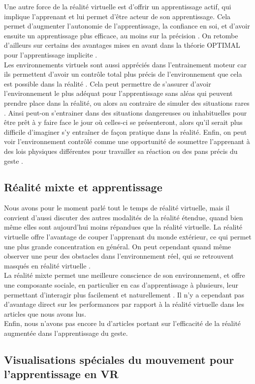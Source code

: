 Une autre force de la réalité virtuelle est d'offrir un apprentissage actif, qui implique l'apprenant et lui permet d'être acteur de son apprentissage. 
Cela permet d'augmenter l'autonomie de l'apprentissage, la confiance en soi, et d'avoir ensuite un apprentissage plus efficace, au moins sur la précision \cite{ApplicationVRForTraining.Tang}. 
On retombe d'ailleurs sur certains des avantages mises en avant dans la théorie OPTIMAL pour l'apprentissage implicite \cite{OPTIMAL.Wulf+}. \\

Les environnements virtuels sont aussi appréciés dans l'entrainement moteur car ils permettent d'avoir un contrôle total plus précis de l'environnement que cela est possible dans la réalité \cite{ComplexSkillVRLearningReview.Levac+}.
Cela peut permettre de s'assurer d'avoir l'environnement le plus adéquat pour l'apprentissage sans aléas qui peuvent prendre place dans la réalité, ou alors au contraire de simuler des situations rares \cite{InvestigateAcquireSkill.Mangalam+}.
Ainsi peut-on s'entrainer dans des situations dangereuses ou inhabituelles pour être prêt à y faire face le jour où celles-ci se présenteront, alors qu'il serait plus difficile d'imaginer s'y entraîner de façon pratique dans la réalité. 
Enfin, on peut voir l'environnement contrôlé comme une opportunité de soumettre l'apprenant à des lois physiques différentes pour travailler sa réaction ou des pans précis du geste \cite{ComplexSkillVRLearningReview.Levac+}. \\

\subsection{Réalité mixte et apprentissage}

Nous avons pour le moment parlé tout le temps de réalité virtuelle, mais il convient d'aussi discuter des autres modalités de la réalité étendue, quand bien même elles sont aujourd'hui moins répandues que la réalité virtuelle. 
La réalité virtuelle offre l'avantage de couper l'apprenant du monde extérieur, ce qui permet une plus grande concentration en général. 
On peut cependant quand même observer une peur des obstacles dans l'environnement réel, qui se retrouvent masqués en réalité virtuelle \cite{EnhancingTaiChi.Tian+}. \\

La réalité mixte permet une meilleure conscience de son environnement, et offre une composante sociale, en particulier en cas d'apprentissage à plusieurs, leur permettant d'interagir plus facilement et naturellement \cite{EnhancingTaiChi.Tian+}.
Il n'y a cependant pas d'avantage direct sur les performances par rapport à la réalité virtuelle dans les articles que nous avons lus. \\

Enfin, nous n'avons pas encore lu d'articles portant sur l'efficacité de la réalité augmentée dans l'apprentissage du geste. 

\subsection{Visualisations spéciales du mouvement pour l'apprentissage en VR}
